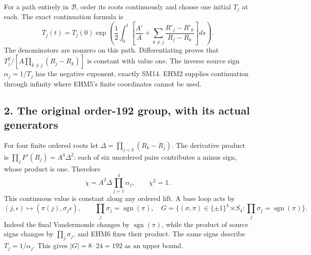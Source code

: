 \documentclass[
  10pt,
  a4paper,
]{article}
\begin{document}
For a path entirely in \(\mathcal B\), order its roots continuously and
choose one initial \(T_j\) at each. The exact continuation formula is \[
T_j(t)=T_j(0)\exp\left(\frac12\int_0^t
\left[\frac{A'}A+\sum_{k\ne j}\frac{R'_j-R'_k}{R_j-R_k}\right]ds\right).
\tag{EHM5}
\] The denominators are nonzero on this path. Differentiating proves
that \(T_j^2/[A\prod_{k\ne j}(R_j-R_k)]\) is constant with value one.
The inverse source sign \(\alpha_j=1/T_j\) has the negative exponent,
exactly SM14. EHM2 supplies continuation through infinity where EHM5's
finite coordinates cannot be used.

\subsection{2. The original order-192 group, with its actual
generators}\label{the-original-order-192-group-with-its-actual-generators}

For four finite ordered roots let \(\Delta=\prod_{j<k}(R_k-R_j)\). The
derivative product is \(\prod_jF'(R_j)=A^4\Delta^2\): each of six
unordered pairs contributes a minus sign, whose product is one.
Therefore \[
\chi=A^2\Delta\prod_{j=1}^4\alpha_j,\qquad \chi^2=1.
\tag{EHM6}
\] This continuous value is constant along any ordered lift. A base loop
acts by \[
(j,\epsilon)\longmapsto(\pi(j),\sigma_j\epsilon),\qquad
\prod_j\sigma_j=\operatorname{sgn}(\pi),
\quad
G=\{(\sigma,\pi)\in\{\pm1\}^4\rtimes S_4:
\prod_j\sigma_j=\operatorname{sgn}(\pi)\}.
\tag{EHM7}
\] Indeed the final Vandermonde changes by \(\operatorname{sgn}(\pi)\),
while the product of source signs changes by \(\prod_j\sigma_j\), and
EHM6 fixes their product. The same signs describe \(T_j=1/\alpha_j\).
This gives \(|G|=8\cdot24=192\) as an upper bound.
\end{document}
